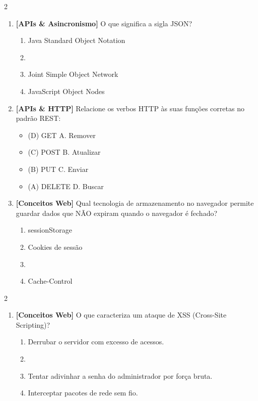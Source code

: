 \documentclass[a4paper,10pt]{article}
\begin{document}
\begin{multicols*}{2}
\begin{enumerate}[label=\textbf{\arabic*.}, resume, leftmargin=*]
\item \textbf{[APIs \& Asincronismo]} O que significa a sigla JSON?
\begin{enumerate}[label=(\alph*), noitemsep]
  \item Java Standard Object Notation
  \item {}
  \item Joint Simple Object Network
  \item JavaScript Object Nodes
\end{enumerate}

\item \textbf{[APIs \& HTTP]} Relacione os verbos HTTP às suas funções corretas no padrão REST:
\begin{itemize}[noitemsep]
  \item (D) GET \hfill A. Remover
  \item (C) POST \hfill B. Atualizar
  \item (B) PUT \hfill C. Enviar
  \item (A) DELETE \hfill D. Buscar
\end{itemize}

\item \textbf{[Conceitos Web]} Qual tecnologia de armazenamento no navegador permite guardar dados que NÃO expiram quando o navegador é fechado?
\begin{enumerate}[label=(\alph*), noitemsep]
  \item sessionStorage
  \item Cookies de sessão
  \item {}
  \item Cache-Control
\end{enumerate}

\end{enumerate}
\end{multicols*}
\newpage
\begin{multicols*}{2}
\begin{enumerate}[label=\textbf{\arabic*.}, resume, leftmargin=*]
\item \textbf{[Conceitos Web]} O que caracteriza um ataque de XSS (Cross-Site Scripting)?
\begin{enumerate}[label=(\alph*), noitemsep]
  \item Derrubar o servidor com excesso de acessos.
  \item {}
  \item Tentar adivinhar a senha do administrador por força bruta.
  \item Interceptar pacotes de rede sem fio.
\end{enumerate}


\end{enumerate}
\end{multicols*}
\end{document}
